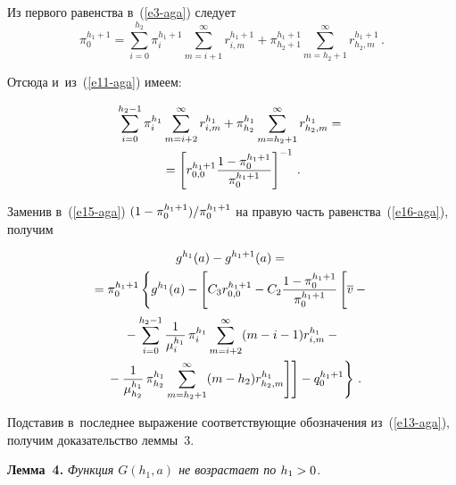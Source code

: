 \begin{multicols}{2}
  \vspace*{-3pt}
  
  Из первого равенства в~(\ref{e3-aga}) следует 
  $$
  \pi_0^{h_1+1} =\sum\limits_{i=0}^{h_2} \pi_i^{h_1+1} 
\sum\limits^\infty_{m=i+1} r_{i,m}^{h_1+1} +\pi_{h_2+1}^{h_1+1} 
\sum\limits^\infty_{m=h_2+1} r^{h_1+1}_{h_2,m}\,.
  $$
  
  Отсюда и~из~(\ref{e11-aga}) имеем:
  
  \vspace*{-3pt}
  
  \noindent
  \begin{multline}
  \sum\limits_{i=0}^{h_2-1} \pi_i^{h_1} \sum\limits^\infty_{m=i+2} 
r^{h_1}_{i,m} +\pi^{h_1}_{h_2} \sum\limits^\infty_{m=h_2+1} r^{h_1}_{h_2,m} 
= {}\\
{}=\left[ r_{0,0}^{h_1+1} \displaystyle\frac{\displaystyle 1-\pi_0^{h_1+1}\mathstrut}{\displaystyle \pi_0^{h_1+1}\mathstrut}\right]^{-1}\,.
  \label{e16-aga}
  \end{multline}
  
  \vspace*{-3pt}
  
  \noindent
Заменив в~(\ref{e15-aga}) $(1\hm- \pi_0^{h_1+1})/\pi_0^{h_1+1}$ на правую 
часть равенства~(\ref{e16-aga}), получим

\vspace*{-3pt}

\noindent
\begin{multline*}
g^{h_1}(a) -g^{h_1+1}(a) ={}\\
{}=\pi_0^{h_1+1} \left\{ 
g^{h_1}(a) -\left[ 
\vphantom{\sum\limits^\infty_{m=h_2+1}}
C_3 r^{h_1+1}_{0,0} -C_2 \fr{1-\pi_0^{h_1+1}}{\pi_0^{h_1+1}}\left[ 
\vphantom{\sum\limits^\infty_{m=h_2+1}}
\overline{v} -{}\right.\right.\right.\\
{}-
\sum\limits_{i=0}^{h_2-1} \fr{1}{\mu_i^{h_1}}\,\pi_i^{h_1} 
\sum\limits^\infty_{m=i+2} (m-i-1) r^{h_1}_{i,m}-{} \\
\left.\left.\left.{}- \fr{1}{\mu^{h_1}_{h_2}} \,\pi^{h_1}_{h_2} 
\sum\limits^\infty_{m=h_2+1} (m-h_2) r^{h_1}_{h_2,m} \right]\right] - 
q_0^{h_1+1}\right\}\,.
\end{multline*}

\vspace*{-3pt}

\noindent
Подставив в~последнее выражение со\-от\-вет\-ст\-ву\-ющие обозначения  
из~(\ref{e13-aga}), получим доказательство леммы~3.

\smallskip

\noindent
\textbf{Лемма~4.} \textit{Функция $G(h_1,a)$ не возрастает по} 
$h_1\hm>0$.


\end{multicols}
